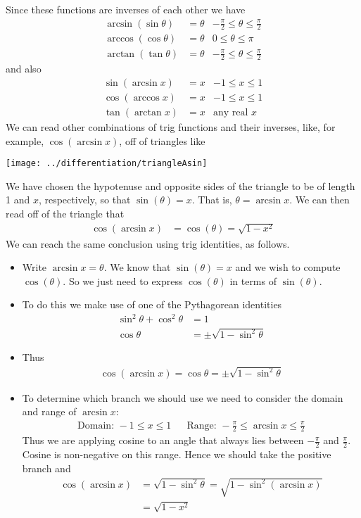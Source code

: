 Since these functions are inverses of each other we have
\begin{align*}
  \arcsin(\sin \theta) &= \theta & -\frac{\pi}{2} \leq \theta \leq \frac{\pi}{2} \\
  \arccos(\cos \theta) &= \theta & 0 \leq \theta \leq \pi \\
  \arctan(\tan \theta) &= \theta & -\frac{\pi}{2} \leq \theta \leq \frac{\pi}{2}
\end{align*}
and also
\begin{align*}
  \sin(\arcsin x) &= x & -1 \leq x \leq 1 \\
  \cos(\arccos x) &= x & -1 \leq x \leq 1 \\
  \tan(\arctan x) &= x & \text{any real $x$}
\end{align*}
We can read other combinations of trig functions and their inverses, like, for
example, $\cos(\arcsin x)$, off of triangles like
\begin{efig}
\begin{center}
\texttt{[image: ../differentiation/triangleAsin]}
\end{center}
\end{efig}
We have chosen the hypotenuse and opposite sides of the triangle
to be of length 1 and $x$, respectively, so that
$\sin(\theta)=x$. That is, $\theta =  \arcsin x$. We can then
read off of the triangle that
\begin{align*}
  \cos(\arcsin x) &= \cos(\theta) = \sqrt{1-x^2}
\end{align*}
We can reach the same conclusion using trig identities, as
follows.
\begin{itemize}
\item Write $\arcsin x=\theta$. We know that $\sin(\theta)=x$ and we wish to
compute $\cos(\theta)$. So we just need to express $\cos(\theta)$ in terms of
$\sin(\theta)$.

 \item To do this we make use of one of the Pythagorean identities
  \begin{align*}
  \sin^2\theta + \cos^2\theta &=1\\
  \cos\theta &= \pm \sqrt{1-\sin^2\theta}
\end{align*}
\item Thus
\begin{align*}
  \cos(\arcsin x) = \cos\theta = \pm\sqrt{1-\sin^2\theta}
\end{align*}

 \item To determine which branch we should use we need to consider the domain
and range of $\arcsin x$:
\begin{align*}
  \text{Domain: } -1 \leq x \leq 1 && \text{Range: } -\frac{\pi}{2} \leq \arcsin x \leq \frac{\pi}{2}
\end{align*}
  Thus we are applying cosine to an angle that always lies between $-\frac{\pi}{2}$ and $\frac{\pi}{2}$. Cosine is non-negative on this range. Hence we should take the positive branch and
\begin{align*}
  \cos(\arcsin x) &= \sqrt{1-\sin^2\theta}= \sqrt{1-\sin^2(\arcsin x)} \\
  &= \sqrt{1-x^2}
\end{align*}
\end{itemize}
